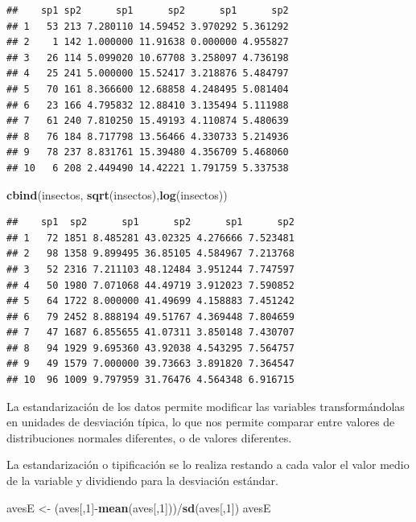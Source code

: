 \documentclass[]{book}
\newenvironment{Shaded}{\begin{snugshade}}{\end{snugshade}}
\newcommand{\KeywordTok}[1]{\textcolor[rgb]{0.13,0.29,0.53}{\textbf{{#1}}}}
\newcommand{\DecValTok}[1]{\textcolor[rgb]{0.00,0.00,0.81}{{#1}}}
\newcommand{\StringTok}[1]{\textcolor[rgb]{0.31,0.60,0.02}{{#1}}}
\newcommand{\NormalTok}[1]{{#1}}
\begin{document}
\begin{verbatim}
##    sp1 sp2      sp1      sp2      sp1      sp2
## 1   53 213 7.280110 14.59452 3.970292 5.361292
## 2    1 142 1.000000 11.91638 0.000000 4.955827
## 3   26 114 5.099020 10.67708 3.258097 4.736198
## 4   25 241 5.000000 15.52417 3.218876 5.484797
## 5   70 161 8.366600 12.68858 4.248495 5.081404
## 6   23 166 4.795832 12.88410 3.135494 5.111988
## 7   61 240 7.810250 15.49193 4.110874 5.480639
## 8   76 184 8.717798 13.56466 4.330733 5.214936
## 9   78 237 8.831761 15.39480 4.356709 5.468060
## 10   6 208 2.449490 14.42221 1.791759 5.337538
\end{verbatim}

\begin{Shaded}
\begin{Highlighting}[]
\KeywordTok{cbind}\NormalTok{(insectos, }\KeywordTok{sqrt}\NormalTok{(insectos),}\KeywordTok{log}\NormalTok{(insectos))}
\end{Highlighting}
\end{Shaded}

\begin{verbatim}
##    sp1  sp2      sp1      sp2      sp1      sp2
## 1   72 1851 8.485281 43.02325 4.276666 7.523481
## 2   98 1358 9.899495 36.85105 4.584967 7.213768
## 3   52 2316 7.211103 48.12484 3.951244 7.747597
## 4   50 1980 7.071068 44.49719 3.912023 7.590852
## 5   64 1722 8.000000 41.49699 4.158883 7.451242
## 6   79 2452 8.888194 49.51767 4.369448 7.804659
## 7   47 1687 6.855655 41.07311 3.850148 7.430707
## 8   94 1929 9.695360 43.92038 4.543295 7.564757
## 9   49 1579 7.000000 39.73663 3.891820 7.364547
## 10  96 1009 9.797959 31.76476 4.564348 6.916715
\end{verbatim}

La estandarización de los datos permite modificar las variables
transformándolas en unidades de desviación típica, lo que nos permite
comparar entre valores de distribuciones normales diferentes, o de
valores diferentes.

La estandarización o tipificación se lo realiza restando a cada valor el
valor medio de la variable y dividiendo para la desviación estándar.

\begin{Shaded}
\begin{Highlighting}[]
\NormalTok{avesE <-}\StringTok{ }\NormalTok{(aves[,}\DecValTok{1}\NormalTok{]-}\KeywordTok{mean}\NormalTok{(aves[,}\DecValTok{1}\NormalTok{]))/}\KeywordTok{sd}\NormalTok{(aves[,}\DecValTok{1}\NormalTok{])}
\NormalTok{avesE}
\end{Highlighting}
\end{Shaded}
\end{document}
